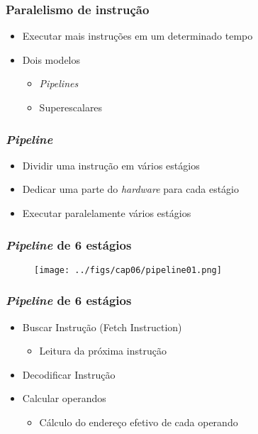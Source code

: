 \documentclass[aspectratio=169,
				xcolor=table]{beamer}
\begin{document}
	\begin{frame}
		\frametitle{Paralelismo de instrução}
		\begin{itemize}
			\item Executar mais instruções em um determinado tempo
			\vspace{1em}
			\item Dois modelos
			\begin{itemize}
				\item \textit{Pipelines}
				\item Superescalares
			\end{itemize}

		\end{itemize}
	\end{frame}
	
	\begin{frame}
		\frametitle{\textit{Pipeline}}
		\begin{itemize}
			\item Dividir uma instrução em vários estágios

			\item Dedicar uma parte do \textit{hardware} para cada estágio

			\item Executar paralelamente vários estágios 

		\end{itemize}
	\end{frame}

	\begin{frame}
		\frametitle{\textit{Pipeline} de 6 estágios}
		\begin{figure}
			\texttt{[image: ../figs/cap06/pipeline01.png]} 
		\end{figure}
	\end{frame}
	
	\begin{frame}
		\frametitle{\textit{Pipeline} de 6 estágios}
		\begin{itemize}
			\item Buscar Instrução (Fetch Instruction)
			\begin{itemize}
				\item Leitura da próxima instrução 
			\end{itemize}
			\vspace{1em}
			\item Decodificar Instrução
			\vspace{1em}
			\item Calcular operandos
			\begin{itemize}
				\item Cálculo do endereço efetivo de cada operando
			\end{itemize}

		\end{itemize}
	\end{frame}
\end{document}
